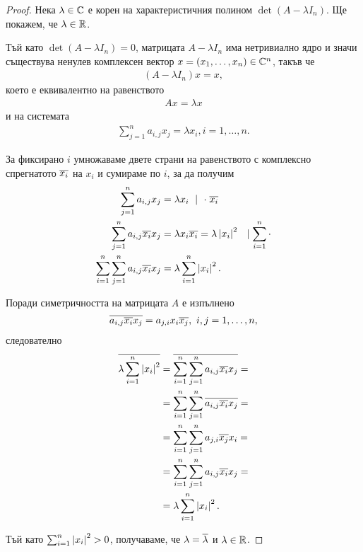 \documentclass[numbers=endperiod, bibliography=totocnumbered]{scrartcl}
\begin{document}
\begin{proof}
  Нека \( \lambda \in \mathbb{C} \) е корен на характеристичния полином \( \det(A - \lambda I_n) \). Ще покажем, че \( \lambda \in \mathbb{R} \).

  Тъй като \( \det(A - \lambda I_n) = 0 \), матрицата \( A - \lambda I_n \) има нетривиално ядро и значи съществува ненулев комплексен вектор \( x = (x_1, \ldots, x_n) \in \mathbb{C}^n \), такъв че
  \begin{align*}
    (A - \lambda I_n) x = x,
  \end{align*}
  което е еквивалентно на равенството
  \begin{align*}
    A x = \lambda x
  \end{align*}
  и на системата
  \begin{align*}
    \sum_{j=1}^n a_{i,j} x_j = \lambda x_i, i = 1, \ldots, n.
  \end{align*}

  За фиксирано \( i \) умножаваме двете страни на равенството с комплексно спрегнатото \( \overline{x_i} \) на \( x_i \) и сумираме по \( i \), за да получим
  \begin{align*}
    \sum_{j=1}^n a_{i,j} x_j
    &=
    \lambda x_i~\mid~\cdot \; \overline{x_i}
    \\
    \sum_{j=1}^n a_{i,j} \overline{x_i} x_j
    &=
    \lambda x_i \overline{x_i} = \lambda \left\vert x_i \right\vert^2~~\mid \sum_{i=1}^n \cdot
    \\
    \sum_{i=1}^n \sum_{j=1}^n a_{i,j} \overline{x_i} x_j
    &=
    \lambda \sum_{i=1}^n \left\vert x_i \right\vert^2.
  \end{align*}

  Поради симетричността на матрицата \( A \) е изпълнено
  \begin{align*}
    \overline{a_{i,j} \overline{x_i} x_j}
    =
    a_{j,i} x_i \overline{x_j},~i, j = 1, \ldots, n,
  \end{align*}
  следователно
  \begin{align*}
    \overline{\lambda \sum_{i=1}^n \left\vert x_i \right\vert^2}
    &=
    \overline{\sum_{i=1}^n \sum_{j=1}^n a_{i,j} \overline{x_i} x_j}
    = \\ &=
    \sum_{i=1}^n \sum_{j=1}^n \overline{a_{i,j} \overline{x_i} x_j}
    = \\ &=
    \sum_{i=1}^n \sum_{j=1}^n a_{j,i} \overline{x_j} x_i
    = \\ &=
    \sum_{i=1}^n \sum_{j=1}^n a_{i,j} \overline{x_i} x_j
    = \\ &=
    \lambda \sum_{i=1}^n \left\vert x_i \right\vert^2.
  \end{align*}

  Тъй като \( \sum_{i=1}^n \left\vert x_i \right\vert^2 > 0 \), получаваме, че \( \lambda = \overline{\lambda} \) и \( \lambda \in \mathbb{R} \).
\end{proof}
\end{document}
